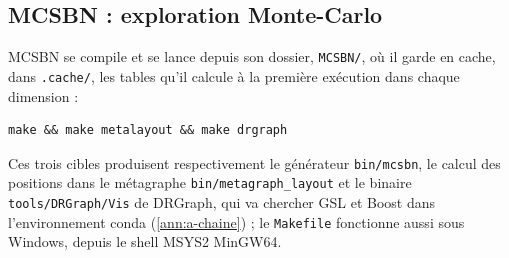 \subsection{MCSBN : exploration Monte-Carlo}
\label{ann:mcsbn}


MCSBN se compile et se lance depuis son dossier, \texttt{MCSBN/}, où il garde en cache, dans \texttt{.cache/}, les tables qu'il calcule à la première exécution dans chaque dimension :
\begin{verbatim}
make && make metalayout && make drgraph
\end{verbatim}
Ces trois cibles produisent respectivement le générateur \texttt{bin/mcsbn}, le calcul des positions dans le métagraphe \texttt{bin/metagraph\_layout} et le binaire \texttt{tools/DRGraph/Vis} de DRGraph, qui va chercher GSL et Boost dans l'environnement conda (\cref{ann:a-chaine}) ; le \texttt{Makefile} fonctionne aussi sous Windows, depuis le shell MSYS2 MinGW64.

